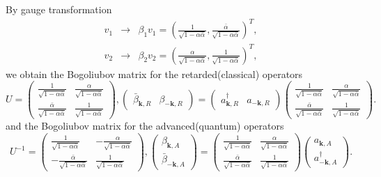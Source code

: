 \documentclass[aps,onecolumn,superscriptaddress,notitlepage,longbibliography]{revtex4-1}
\newcommand{\tmmathbf}[1]{\ensuremath{\boldsymbol{#1}}}
\begin{document}
By gauge transformation
\begin{eqnarray}
  v_1 & \rightarrow & \beta_1 v_1 = \left( \frac{1}{\sqrt{1 - \alpha
  \bar{\alpha}}}, \frac{\bar{\alpha}}{\sqrt{1 - \alpha \bar{\alpha}}}
  \right)^T, \\
  v_2 & \rightarrow & \beta_2 v_2 = \left( \frac{\alpha}{\sqrt{1 - \alpha
  \bar{\alpha}}}, \frac{1}{\sqrt{1 - \alpha \bar{\alpha}}} \right)^T, 
\end{eqnarray}
we obtain the Bogoliubov matrix for the retarded(classical) operators
\begin{equation}
  U = \left(\begin{array}{cc}
    \frac{1}{\sqrt{1 - \alpha \bar{\alpha}}} & \frac{\alpha}{\sqrt{1 - \alpha
    \bar{\alpha}}}\\
    \frac{\bar{\alpha}}{\sqrt{1 - \alpha \bar{\alpha}}} & \frac{1}{\sqrt{1 -
    \alpha \bar{\alpha}}}
  \end{array}\right), \left(\begin{array}{cc}\bar{\beta}_{\tmmathbf{k}, R} &
    \beta_{- \tmmathbf{k}, R}\end{array}\right) = \left(\begin{array}{cc}a^{\dagger}_{\tmmathbf{k}, R} &
    a_{- \tmmathbf{k}, R}\end{array}\right)\left(\begin{array}{cc}
    \frac{1}{\sqrt{1 - \alpha \bar{\alpha}}} & \frac{\alpha}{\sqrt{1 - \alpha
    \bar{\alpha}}}\\
    \frac{\bar{\alpha}}{\sqrt{1 - \alpha \bar{\alpha}}} & \frac{1}{\sqrt{1 -
    \alpha \bar{\alpha}}}
  \end{array}\right).
\end{equation}
and the Bogoliubov matrix for the advanced(quantum) operators
\begin{equation}
  U^{- 1} = \left(\begin{array}{cc}
    \frac{1}{\sqrt{1 - \alpha \bar{\alpha}}} & - \frac{\alpha}{\sqrt{1 -
    \alpha \bar{\alpha}}}\\
    - \frac{\bar{\alpha}}{\sqrt{1 - \alpha \bar{\alpha}}} & \frac{1}{\sqrt{1 -
    \alpha \bar{\alpha}}}
  \end{array}\right), \left(\begin{array}{c}
    \beta_{\tmmathbf{k}, A}\\
    \bar{\beta}_{- \tmmathbf{k}, A}
  \end{array}\right) = \left(\begin{array}{cc}
    \frac{1}{\sqrt{1 - \alpha \bar{\alpha}}} & \frac{\alpha}{\sqrt{1 - \alpha
    \bar{\alpha}}}\\
    \frac{\bar{\alpha}}{\sqrt{1 - \alpha \bar{\alpha}}} & \frac{1}{\sqrt{1 -
    \alpha \bar{\alpha}}}
  \end{array}\right) \left(\begin{array}{c}
    a_{\tmmathbf{k}, A}\\
    a^{\dagger}_{- \tmmathbf{k}, A}
  \end{array}\right) .
\end{equation}
\end{document}

